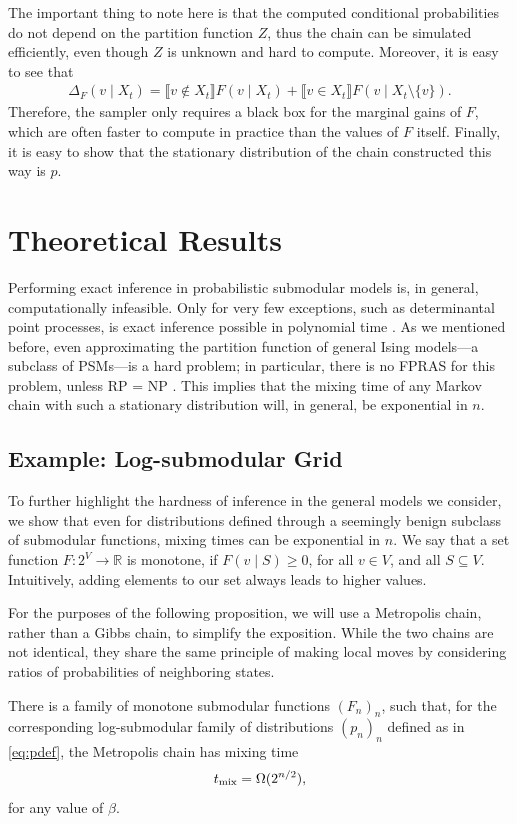The important thing to note here is that the computed conditional probabilities do not depend on the partition function $Z$, thus the chain can be simulated efficiently, even though $Z$ is unknown and hard to compute.
Moreover, it is easy to see that
\begin{align*}
\Delta_F(v \mid X_t) = \llbracket v\not\in X_t\rrbracket F(v \mid X_t) + \llbracket v\in X_t\rrbracket F(v \mid X_t\setminus\{v\}).
\end{align*}
Therefore, the sampler only requires a black box for the marginal gains of $F$, which are often faster to compute in practice than the values of $F$ itself.
Finally, it is easy to show that the stationary distribution of the chain constructed this way is $p$.

\section{Theoretical Results}
Performing exact inference in probabilistic submodular models is, in general, computationally infeasible.
Only for very few exceptions, such as determinantal point processes, is exact inference possible in polynomial time \cite{kulesza12}.
As we mentioned before, even approximating the partition function of general Ising models---a subclass of PSMs---is a hard problem; in particular, there is no FPRAS for this problem, unless RP = NP \cite{jerrum93}.
This implies that the mixing time of any Markov chain with such a stationary distribution will, in general, be exponential in $n$.

\subsection{Example: Log-submodular Grid}
To further highlight the hardness of inference in the general models we consider, we show that even for distributions defined through a seemingly benign subclass of submodular functions, mixing times can be exponential in $n$.
We say that a set function $F : 2^V \to \mathbb{R}$ is monotone, if $F(v \mid S) \geq 0$, for all $v \in V$, and all $S \subseteq V$.
Intuitively, adding elements to our set always leads to higher values.

For the purposes of the following proposition, we will use a Metropolis chain, rather than a Gibbs chain, to simplify the exposition.
While the two chains are not identical, they share the same principle of making local moves by considering ratios of probabilities of neighboring states.
\begin{prop}
There is a family of monotone submodular functions $(F_n)_n$, such that, for the corresponding log-submodular family of distributions $(p_n)_n$ defined as in \eqref{eq:pdef}, the Metropolis chain has mixing time
\begin{align*}
  t_{\mathrm{mix}}  = \Omega(2^{n/2}),
\end{align*}
for any value of $\beta$.
\end{prop}

